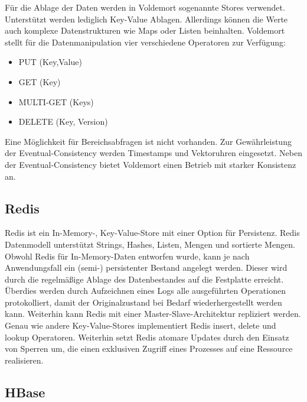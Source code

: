 Für die Ablage der Daten werden in Voldemort sogenannte Stores verwendet. Unterstützt werden lediglich Key-Value Ablagen. Allerdings können die Werte auch komplexe Datenstrukturen wie Maps oder Listen beinhalten. Voldemort stellt für die Datenmanipulation vier verschiedene Operatoren zur Verfügung:

\begin{itemize}

	\item PUT (Key,Value)
	\item GET (Key)
	\item MULTI-GET (Keys)
	\item DELETE (Key, Version) 

\end{itemize}

Eine Möglichkeit für Bereichsabfragen ist nicht vorhanden. Zur Gewährleistung der Eventual-Consistency werden Timestamps und Vektoruhren eingesetzt. Neben der Eventual-Consistency bietet Voldemort einen Betrieb mit starker Konsistenz an.       

\subsection{Redis}
\label{ch:AnalyseDatenbanken:sec:Datenbanken:subsec:Redis}

Redis \cite{red2013} ist ein In-Memory-, Key-Value-Store mit einer Option für Persistenz. Redis Datenmodell unterstützt Strings, Hashes, Listen, Mengen und sortierte Mengen. Obwohl Redis für In-Memory-Daten entworfen wurde, kann je nach Anwendungsfall ein (semi-) persistenter Bestand angelegt werden. Dieser wird durch die regelmäßige Ablage des Datenbestandes auf die Festplatte erreicht. Überdies werden durch Aufzeichnen eines Logs alle ausgeführten Operationen protokolliert, damit der Originalzustand bei Bedarf wiederhergestellt werden kann. Weiterhin kann Redis mit einer Master-Slave-Architektur repliziert werden. Genau wie andere Key-Value-Stores implementiert Redis insert, delete und lookup Operatoren. Weiterhin setzt Redis atomare Updates durch den Einsatz von Sperren um, die einen exklusiven Zugriff eines Prozesses auf eine Ressource realisieren. 

\subsection{HBase} 
\label{ch:AnalyseDatenbanken:sec:Datenbanken:subsec:HBase}

